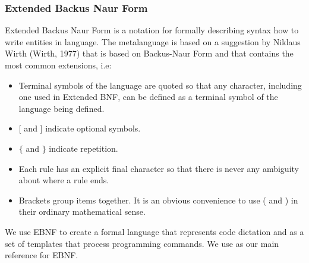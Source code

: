 \subsubsection{Extended Backus Naur Form}
Extended Backus Naur Form is a notation for formally describing syntax how to write entities in language. The metalanguage is based on a suggestion by Niklaus Wirth (Wirth, 1977) that is based on Backus-Naur Form and that contains the most common extensions, i.e:
\begin{itemize}
	\item Terminal symbols of the language are quoted so that any character,
	including one used in Extended BNF, can be defined as a terminal symbol of
	the language being defined.
	\item $ [ $ and $ ] $ indicate optional symbols.
	\item $ \{ $ and $ \} $ indicate repetition.
	\item Each rule has an explicit final character so that there is never any
	ambiguity about where a rule ends.
	\item Brackets group items together. It is an obvious convenience to use ( and ) in their ordinary mathematical sense.
\end{itemize}
We use EBNF to create a formal language that represents code dictation and as a set of templates that process programming commands. We use \citet{IEEEBNF1996} as our main reference for EBNF.